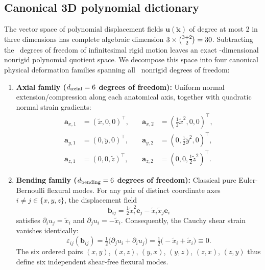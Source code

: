 \documentclass[11pt]{article}
\begin{document}
\subsection{Canonical 3D polynomial dictionary}
The vector space of polynomial displacement fields $\mathbf u(\tilde{\mathbf x})$ of degree at most 2 in three dimensions has complete algebraic dimension $3 \times \binom{3+2}{2} = 30$.
Subtracting the \RigidDOFs\ degrees of freedom of infinitesimal rigid motion leaves an exact \NonrigidDOFs-dimensional nonrigid polynomial quotient space.
We decompose this space into four canonical physical deformation families spanning all \NonrigidDOFs\ nonrigid degrees of freedom:
\begin{enumerate}[label=(\roman*)]
\item \textbf{Axial family ($d_{\rm axial} = 6$ degrees of freedom):}
Uniform normal extension/compression along each anatomical axis, together with quadratic normal strain gradients:
\begin{equation}
\begin{aligned}
\mathbf a_{x,1} &= (\tilde x, 0, 0)^\top, &\quad \mathbf a_{x,2} &= (\tfrac{1}{2}\tilde x^2, 0, 0)^\top, \\
\mathbf a_{y,1} &= (0, \tilde y, 0)^\top, &\quad \mathbf a_{y,2} &= (0, \tfrac{1}{2}\tilde y^2, 0)^\top, \\
\mathbf a_{z,1} &= (0, 0, \tilde z)^\top, &\quad \mathbf a_{z,2} &= (0, 0, \tfrac{1}{2}\tilde z^2)^\top.
\end{aligned}
\label{eq:axial-family}
\end{equation}

\item \textbf{Bending family ($d_{\rm bending} = 6$ degrees of freedom):}
Classical pure Euler-Bernoulli flexural modes.
For any pair of distinct coordinate axes $i \ne j \in \{x, y, z\}$, the displacement field
\begin{equation}
\mathbf b_{ij} = \tfrac{1}{2}\tilde x_i^2 \mathbf e_j - \tilde x_i \tilde x_j \mathbf e_i
\label{eq:bending-family}
\end{equation}
satisfies $\partial_i u_j = \tilde x_i$ and $\partial_j u_i = -\tilde x_i$.
Consequently, the Cauchy shear strain vanishes identically:
\begin{equation}
\varepsilon_{ij}(\mathbf b_{ij}) = \tfrac{1}{2}\big(\partial_j u_i + \partial_i u_j\big) = \tfrac{1}{2}\big(-\tilde x_i + \tilde x_i\big) \equiv 0.
\end{equation}
The six ordered pairs $(x,y)$, $(x,z)$, $(y,x)$, $(y,z)$, $(z,x)$, $(z,y)$ thus define six independent shear-free flexural modes.


\end{enumerate}
\end{document}
